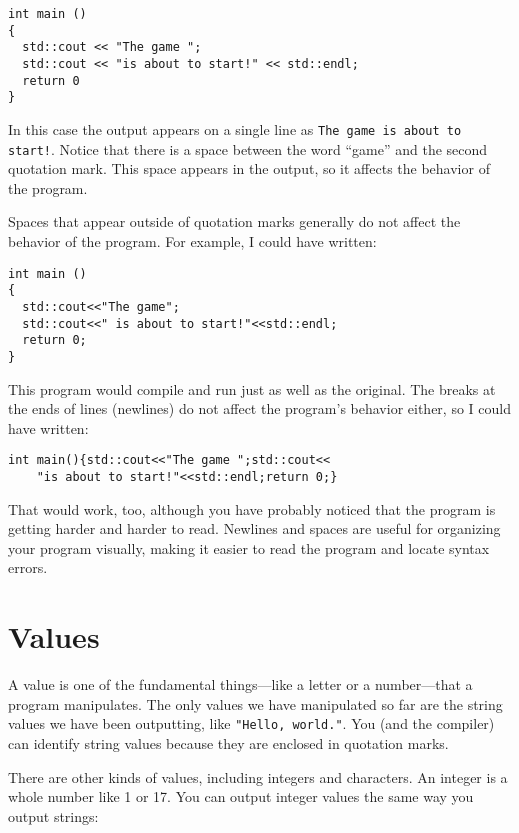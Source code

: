 \begin{lstlisting}[frame=single]
int main ()
{
  std::cout << "The game ";
  std::cout << "is about to start!" << std::endl;
  return 0
}
\end{lstlisting}

In this case the output appears on a single line as
{\tt The game is about to start!}.  Notice that there is a space
between the word ``game'' and the second quotation mark.
This space appears in the output, so it affects the behavior
of the program.

Spaces that appear outside of quotation marks generally do
not affect the behavior of the program.  For example, I
could have written:

\begin{lstlisting}[frame=single]
int main ()
{
  std::cout<<"The game";
  std::cout<<" is about to start!"<<std::endl;
  return 0;
}
\end{lstlisting}

This program would compile and run just as well as the original.
The breaks at the ends of lines (newlines) do not affect
the program's behavior either, so I could have written:

\begin{lstlisting}[frame=single]
int main(){std::cout<<"The game ";std::cout<<
    "is about to start!"<<std::endl;return 0;}
\end{lstlisting}

That would work, too, although you have probably noticed that
the program is getting harder and harder to read.  Newlines and
spaces are useful for organizing your program visually, making
it easier to read the program and locate syntax errors.

\section{Values}

A value is one of the fundamental things---like a letter or
a number---that a program manipulates.  The only values we have
manipulated so far are the string values we have been outputting, like
{\tt "Hello, world."}.  You (and the compiler) can identify
string values because they are enclosed in quotation marks.

There are other kinds of values, including integers and characters.
An integer is a whole number like 1 or 17.  You can output
integer values the same way you output strings:

